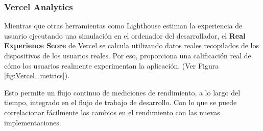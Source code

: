 \documentclass[12pt,twoside,titlepage]{report}
\begin{document}
\subsubsection{Vercel Analytics}
\label{sec:analytics}

Mientras que otras herramientas como Lighthouse estiman la experiencia de usuario ejecutando una simulación en el ordenador del desarrollador, el \textbf{Real Experience Score} de Vercel se calcula utilizando datos reales recopilados de los dispositivos de los usuarios reales. Por eso, proporciona una calificación real de cómo los usuarios realmente experimentan la aplicación.
(Ver Figura \ref{fig:Vercel_metrics}).

Esto permite un flujo continuo de mediciones de rendimiento, a lo largo del tiempo, integrado en el flujo de trabajo de desarrollo. Con lo que se puede correlacionar fácilmente los cambios en el rendimiento con las nuevas implementaciones.

\end{document}
